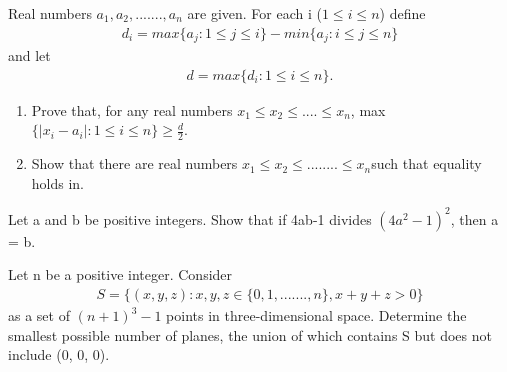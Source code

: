 \item Real numbers $a_1, a_2,......., a_n$ are given. For each i ($1 \leq i \leq n$) define
\begin{align*}
d_i = max\{a_j : 1 \leq j \leq i\} - min\{a_j : i \leq j \leq  n\}
\end{align*}
and let
\begin{align*} 
d = max\{d_i : 1\leq i \leq n\}.
\end{align*}
\begin{enumerate}
\item Prove that, for any real numbers $ x_1 \leq x_2 \leq$....$\leq x_n$,
      max$\{|x_i - a_i| : 1\leq i \leq n\} \geq \frac{d}{2}$.
\item Show that there are real numbers $x_1 \leq x_2 \leq $........$\leq x_n $such that equality holds in.
\end{enumerate} 

\item Let a and b be positive integers. Show that if 4ab-1 divides $(4a^{2}-1)^{2}$,
then a = b.

\item Let n be a positive integer. Consider
\begin{align*}
S = \{(x, y, z) : x, y, z\in  \{0, 1,......., n\}, x + y + z > 0\}
\end{align*}
as a set of $(n+1)^3 - 1$ points in three-dimensional space. Determine the smallest possible number of planes, the union of which contains S but does not include (0, 0, 0).

